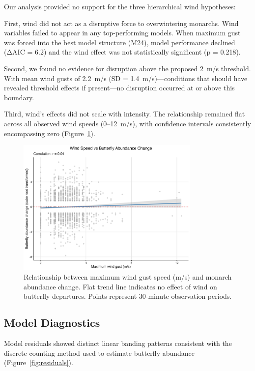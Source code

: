 Our analysis provided no support for the three hierarchical wind hypotheses:

First, wind did not act as a disruptive force to overwintering monarchs. Wind variables failed to appear in any top-performing models. When maximum gust was forced into the best model structure (M24), model performance declined (ΔAIC = 6.2) and the wind effect was not statistically significant (p = 0.218).

Second, we found no evidence for disruption above the proposed 2~m/s threshold. With mean wind gusts of 2.2~m/s (SD = 1.4~m/s)—conditions that should have revealed threshold effects if present—no disruption occurred at or above this boundary.

Third, wind's effects did not scale with intensity. The relationship remained flat across all observed wind speeds (0–12~m/s), with confidence intervals consistently encompassing zero (Figure~\ref{fig:wind_scatter}).

\begin{figure}[htbp]
\centering
\includegraphics[width=0.8\textwidth]{supplemental/results/thesis_exports/figures/wind_hypothesis_scatter.png}
\caption{Relationship between maximum wind gust speed (m/s) and monarch abundance change. Flat trend line indicates no effect of wind on butterfly departures. Points represent 30-minute observation periods.}\label{fig:wind_scatter}
\end{figure}

\subsection{Model Diagnostics}

Model residuals showed distinct linear banding patterns consistent with the discrete counting method used to estimate butterfly abundance (Figure~\ref{fig:residuals}).


